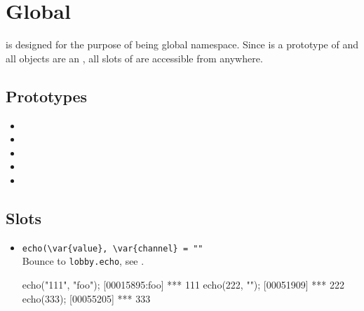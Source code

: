 \section{Global}

 is designed for the purpose of being global
namespace. Since  is a prototype of  and all
objects are an , all slots of  are accessible from
anywhere.

\subsection{Prototypes}
\begin{itemize}
\item {}
\item {}
\item {}
\item {}
\item {}
\end{itemize}

\subsection{Slots}
\begin{itemize}
\item \lstinline|echo(\var{value}, \var{channel} = ""|\\
  Bounce to \lstinline|lobby.echo|, see .
\begin{urbiscript}[firstnumber=last]
echo("111", "foo");
[00015895:foo] *** 111
echo(222, "");
[00051909] *** 222
echo(333);
[00055205] *** 333
\end{urbiscript}

\end{itemize}


